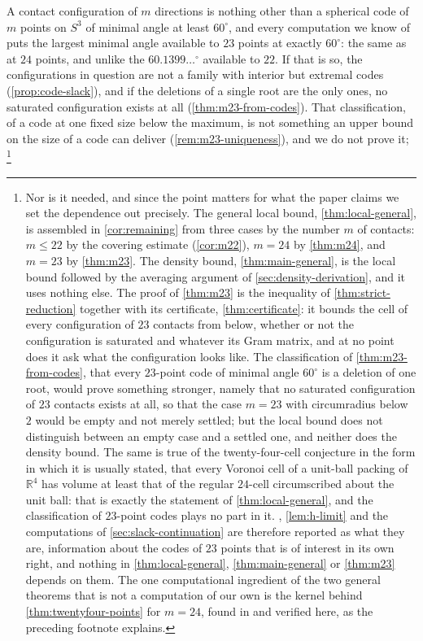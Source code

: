 \documentclass[11pt,reqno]{amsart}
\renewcommand{\_}{\origunderscore\allowbreak}
\numberwithin{equation}{section}
\theoremstyle{plain}
\theoremstyle{definition}
\theoremstyle{remark}
\begin{document}
A contact configuration of $m$ directions is nothing other than a
spherical code of $m$ points on $S^3$ of minimal angle at least
$60^\circ$, and every computation we know of puts the largest minimal
angle available to $23$ points at exactly $60^\circ$: the same as at
$24$ points, and unlike the $60.1399\ldots^\circ$ available to $22$. If
that is so, the configurations in question are not a family with
interior but extremal codes (\cref{prop:code-slack}), and if the
deletions of a single root are the only ones, no saturated
configuration exists at all (\cref{thm:m23-from-codes}). That
classification, of a code at one fixed size below the maximum, is not
something an upper bound on the size of a code can deliver
(\cref{rem:m23-uniqueness}), and we do not prove it;%
\footnote{Nor is it needed, and since the point matters for what the
  paper claims we set the dependence out precisely. The general local
  bound, \cref{thm:local-general}, is assembled in \cref{cor:remaining}
  from three cases by the number $m$ of contacts: $m\le22$ by the
  covering estimate (\cref{cor:m22}), $m=24$ by \cref{thm:m24}, and
  $m=23$ by \cref{thm:m23}. The density bound, \cref{thm:main-general},
  is the local bound followed by the averaging argument of
  \cref{sec:density-derivation}, and it uses nothing else. The proof
  of \cref{thm:m23} is the inequality of \cref{thm:strict-reduction}
  together with its certificate, \cref{thm:certificate}: it bounds the
  cell of every configuration of $23$ contacts from below, whether or
  not the configuration is saturated and whatever its Gram matrix, and
  at no point does it ask what the configuration looks like. The
  classification of \cref{thm:m23-from-codes}, that every $23$-point
  code of minimal angle $60^\circ$ is a deletion of one root, would
  prove something stronger, namely that no saturated configuration of
  $23$ contacts exists at all, so that the case $m=23$ with circumradius
  below $2$ would be empty and not merely settled; but the local
  bound does not distinguish between an empty case and a settled one,
  and neither does the density bound. The same is true of the
  twenty-four-cell conjecture in the form in which it is usually
  stated, that every Voronoi cell of a unit-ball packing of
  $\mathbb{R}^4$ has volume at least that of the regular $24$-cell
  circumscribed about the unit ball: that is exactly the statement of
  \cref{thm:local-general}, and the classification of $23$-point codes
  plays no part in it. , \cref{lem:h-limit} and the
  computations of \cref{sec:slack-continuation} are therefore reported
  as what they are, information about the codes of $23$ points that is
  of interest in its own right, and nothing in
  \cref{thm:local-general}, \cref{thm:main-general} or \cref{thm:m23}
  depends on them. The one computational ingredient of the two general
  theorems that is not a computation of our own is the kernel behind
  \cref{thm:twentyfour-points} for $m=24$, found in \cite{LLM24} and
  verified here, as the preceding footnote explains.}
\end{document}

